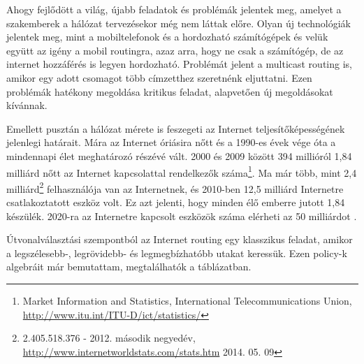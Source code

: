  Ahogy fejlődött a világ, újabb feladatok és problémák jelentek meg, amelyet a szakemberek a hálózat tervezésekor még nem láttak előre. Olyan új technológiák jelentek meg, mint a mobiltelefonok és a hordozható számítógépek és velük együtt az igény a mobil routingra, azaz arra, hogy ne csak a számítógép, de az internet hozzáférés is legyen hordozható. Problémát jelent a multicast routing is, amikor egy adott csomagot több címzetthez szeretnénk eljuttatni. Ezen problémák hatékony megoldása kritikus feladat, alapvetően új megoldásokat kívánnak.

  Emellett pusztán a hálózat mérete is feszegeti az Internet teljesítőképességének jelenlegi határait. Mára az Internet óriásira nőtt és a 1990-es évek vége óta a mindennapi élet meghatározó részévé vált. 2000 és 2009 között 394 millióról 1,84 milliárd nőtt az Internet kapcsolattal rendelkezők száma\footnote{Market Information and Statistics, International Telecommunications Union, \url{http://www.itu.int/ITU-D/ict/statistics/}}. Ma már több, mint 2,4 milliárd\footnote{2.405.518.376 - 2012. második negyedév, \url{http://www.internetworldstats.com/stats.htm} 2014. 05. 09} felhasználója van az Internetnek, és 2010-ben 12,5 milliárd Internetre csatlakoztatott eszköz volt. Ez azt jelenti, hogy minden élő emberre jutott 1,84 készülék. 2020-ra az Internetre kapcsolt eszközök száma elérheti az 50 milliárdot \cite{The_Internet_of_Things}.\newpage

  Útvonalválasztási szempontból az Internet routing egy klasszikus feladat, amikor a legszélesebb-, legrövidebb- és legmegbízhatóbb utakat keressük. Ezen policy-k algebráit már bemutattam, megtalálhatók a  táblázatban.

